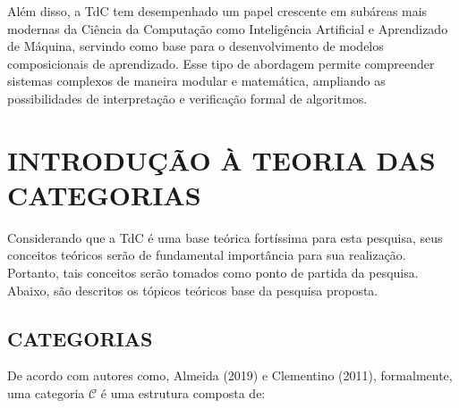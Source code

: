 \documentclass[12pt,a4paper]{article}
\begin{document}
Além disso, a TdC tem desempenhado um papel crescente em subáreas mais modernas da Ciência da Computação como Inteligência Artificial e Aprendizado de Máquina, servindo como base para o desenvolvimento de modelos composicionais de aprendizado. Esse tipo de abordagem permite compreender sistemas complexos de maneira modular e matemática, ampliando as possibilidades de interpretação e verificação formal de algoritmos.

\section{INTRODUÇÃO À TEORIA DAS CATEGORIAS}
\label{sec:tdc}

Considerando que a TdC é uma base teórica fortíssima para esta pesquisa, seus conceitos teóricos serão de fundamental importância para sua realização. Portanto, tais conceitos serão tomados como ponto de partida da pesquisa. Abaixo, são descritos os tópicos teóricos base da pesquisa proposta.

\subsection{CATEGORIAS}
\label{sec:cat}

De acordo com autores como, Almeida (2019) e Clementino (2011), formalmente, uma categoria $\mathcal{C}$ é uma estrutura composta de:
\end{document}
